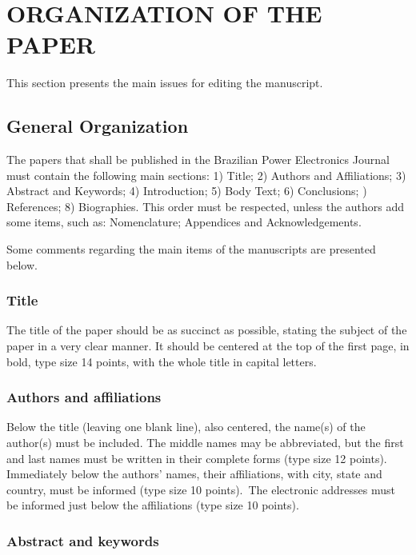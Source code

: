 \documentclass[english]{cobep-spec}
\begin{document}
\section{ORGANIZATION OF THE PAPER}

This section presents the main issues for editing the manuscript.

\subsection{General Organization}

The papers that shall be published in the Brazilian Power Electronics Journal must contain the following main sections:
1) Title; 2) Authors and Affiliations; 3) Abstract and Keywords; 4) Introduction; 5) Body Text; 6) Conclusions; ) References; 8) Biographies. This order must be respected, unless the authors add some items, such as: Nomenclature; Appendices and Acknowledgements.

Some comments regarding the main items of the manuscripts are presented below.

\subsubsection{Title}

The title of the paper should be as succinct as possible, stating the subject of the paper in a very clear manner. It should be centered at the top of the first page, in bold, type size 14 points, with the whole title in capital letters.

\subsubsection{Authors and affiliations}

Below the title (leaving one blank line), also centered, the name(s) of the author(s) must be included. The middle names may be abbreviated, but the first and last names must be written in their complete forms (type size 12 points). Immediately below the authors' names, their affiliations, with city, state and country, must be informed (type size 10 points).~The electronic addresses must be informed just below the affiliations (type size 10 points).

\subsubsection{Abstract and keywords}
\end{document}
